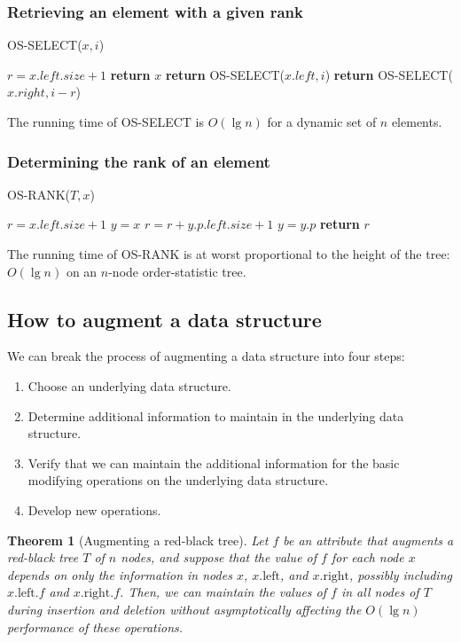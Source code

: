 \documentclass[12pt]{article}
\newtheorem{theorem}{Theorem}
\begin{document}
\subsubsection*{Retrieving an element with a given rank}

OS-SELECT($x,i$)
\begin{algorithmic}[1]
\State $r = x.left.size + 1$
	\State \textbf{return} $x$
	\State \textbf{return} OS-SELECT($x.left, i$)
\Else
	\State \textbf{return} OS-SELECT($x.right, i-r$)
\EndIf
\end{algorithmic}

The running time of OS-SELECT is $O(\lg n)$ for a dynamic set of $n$ elements.

\subsubsection*{Determining the rank of an element}

OS-RANK($T, x$)
\begin{algorithmic}[1]
\State $r = x.left.size + 1$
\State $y = x$
        	\State $r = r + y.p.left.size + 1$
        \EndIf
        \State $y = y.p$
\EndWhile
\State \textbf{return} $r$
\end{algorithmic}

The running time of OS-RANK is at worst proportional to the height of the tree: $O(\lg n)$ on an $n$-node order-statistic tree.

\subsection{How to augment a data structure}

We can break the process of augmenting a data structure into four steps:
\begin{enumerate}
  \item Choose an underlying data structure.
  \item Determine additional information to maintain in the underlying data structure.
  \item Verify that we can maintain the additional information for the basic modifying operations on the underlying data structure.
  \item Develop new operations.
\end{enumerate}

\begin{theorem} [Augmenting a red-black tree]
  Let $f$ be an attribute that augments a red-black tree $T$ of $n$ nodes, and suppose that the value of $f$ for each node $x$ depends on only the information in nodes $x$, $x.\text{left}$, and $x.\text{right}$, possibly including $x.\text{left}.f$ and $x.\text{right}.f$. Then, we can maintain the values of $f$ in all nodes of $T$ during insertion and deletion without asymptotically affecting the $O(\lg n)$ performance of these operations.
\end{theorem}
\end{document}
